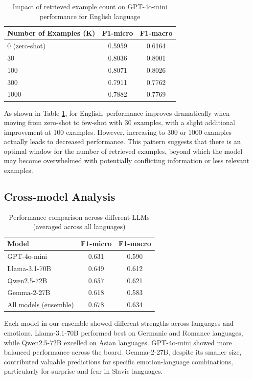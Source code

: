 \documentclass[a4paper,12pt]{extarticle}
\begin{document}
\begin{table}[h]
\centering
\begin{tabular}{lcc}
\toprule
\textbf{Number of Examples (K)} & \textbf{F1-micro} & \textbf{F1-macro} \\
\midrule
0 (zero-shot) & 0.5959 & 0.6164 \\
30 & 0.8036 & 0.8001 \\
100 & 0.8071 & 0.8026 \\
300 & 0.7911 & 0.7762 \\
1000 & 0.7882 & 0.7769 \\
\bottomrule
\end{tabular}
\caption{Impact of retrieved example count on GPT-4o-mini performance for English language}
\label{tab:example_count}
\end{table}

As shown in Table \ref{tab:example_count}, for English, performance improves dramatically when moving from zero-shot to few-shot with 30 examples, with a slight additional improvement at 100 examples. However, increasing to 300 or 1000 examples actually leads to decreased performance. This pattern suggests that there is an optimal window for the number of retrieved examples, beyond which the model may become overwhelmed with potentially conflicting information or less relevant examples.

\subsection{Cross-model Analysis}

\begin{table}[h]
\centering
\begin{tabular}{lcc}
\toprule
\textbf{Model} & \textbf{F1-micro} & \textbf{F1-macro} \\
\midrule
GPT-4o-mini & 0.631 & 0.590 \\
Llama-3.1-70B & 0.649 & 0.612 \\
Qwen2.5-72B & 0.657 & 0.621 \\
Gemma-2-27B & 0.618 & 0.583 \\
All models (ensemble) & 0.678 & 0.634 \\
\bottomrule
\end{tabular}
\caption{Performance comparison across different LLMs (averaged across all languages)}
\label{tab:cross_model}
\end{table}

Each model in our ensemble showed different strengths across languages and emotions. Llama-3.1-70B performed best on Germanic and Romance languages, while Qwen2.5-72B excelled on Asian languages. GPT-4o-mini showed more balanced performance across the board. Gemma-2-27B, despite its smaller size, contributed valuable predictions for specific emotion-language combinations, particularly for surprise and fear in Slavic languages.
\end{document}
